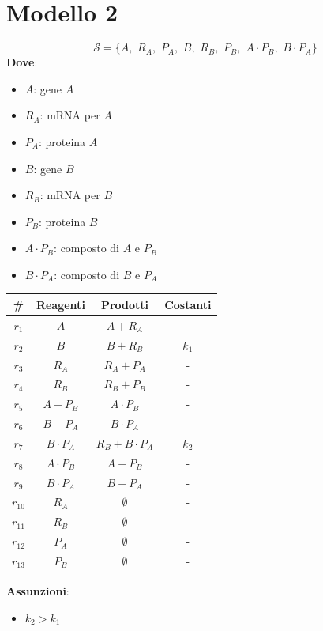 \documentclass{article}
\begin{document}
\section*{Modello 2}
\[\mathcal{S}=\{A,\,\, R_A,\,\, P_A,\,\, B,\,\, R_B,\,\, P_B,\,\, A\cdot
  P_B,\,\, B\cdot P_A\}\] 
\textbf{Dove}:
\begin{multicols}{2}
  \begin{itemize}
    \item $A$: gene $A$
    \item $R_A$: mRNA per $A$
    \item $P_A$: proteina $A$
    \item $B$: gene $B$
    \item $R_B$: mRNA per $B$
    \item $P_B$: proteina $B$
    \item $A\cdot P_B$: composto di $A$ e $P_B$
    \item $B\cdot P_A$: composto di $B$ e $P_A$
  \end{itemize}
\end{multicols}
\begin{table}[H]
  \centering
  \begin{tabular}{c|c|c|c}
    \# & \textbf{Reagenti} & \textbf{Prodotti} & \textbf{Costanti}\\
    \hline
    \hline
    $r_1$ & $A$ & $A+R_A$ & -\\
    $r_2$ & $B$ & $B+R_B$ & $k_1$\\
    $r_3$ & $R_A$ & $R_A+P_A$ & -\\
    $r_4$ & $R_B$ & $R_B+P_B$ & -\\
    $r_5$ & $A+P_B$ & $A\cdot P_B$ & -\\
    $r_6$ & $B+P_A$ & $B\cdot P_A$ & -\\
    $r_7$ & $B\cdot P_A$ & $R_B+B\cdot P_A$ & $k_2$\\
    $r_8$ & $A\cdot P_B$ & $A+P_B$ & -\\
    $r_9$ & $B\cdot P_A$ & $B+P_A$ & -\\
    $r_{10}$ & $R_A$ & $\emptyset$ & -\\
    $r_{11}$ & $R_B$ & $\emptyset$ & -\\
    $r_{12}$ & $P_A$ & $\emptyset$ & -\\
    $r_{13}$ & $P_B$ & $\emptyset$ & -\\
  \end{tabular}
\end{table}
\textbf{Assunzioni}:
\begin{itemize}
  \item $k_2>k_1$
\end{itemize}
\newpage
\end{document}
